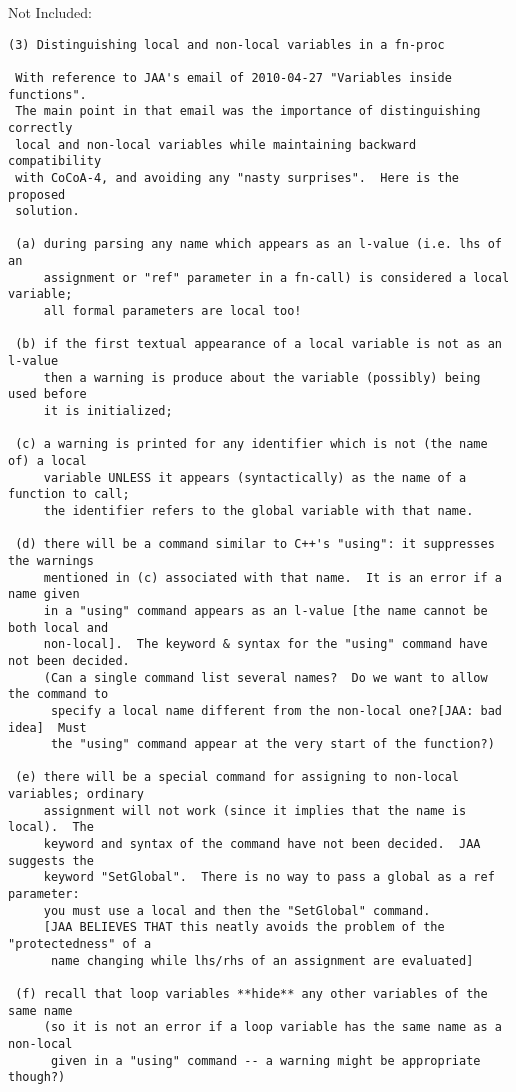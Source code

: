 \documentclass{book}[12,a4paper]
\def\refandpage#1{{\ref{#1}, pg.\pageref{#1}}}
\begin{document}
Not Included: %
\begin{verbatim}
(3) Distinguishing local and non-local variables in a fn-proc

 With reference to JAA's email of 2010-04-27 "Variables inside functions".
 The main point in that email was the importance of distinguishing correctly
 local and non-local variables while maintaining backward compatibility
 with CoCoA-4, and avoiding any "nasty surprises".  Here is the proposed
 solution.

 (a) during parsing any name which appears as an l-value (i.e. lhs of an
     assignment or "ref" parameter in a fn-call) is considered a local variable;
     all formal parameters are local too!

 (b) if the first textual appearance of a local variable is not as an l-value
     then a warning is produce about the variable (possibly) being used before
     it is initialized;

 (c) a warning is printed for any identifier which is not (the name of) a local
     variable UNLESS it appears (syntactically) as the name of a function to call;
     the identifier refers to the global variable with that name.

 (d) there will be a command similar to C++'s "using": it suppresses the warnings
     mentioned in (c) associated with that name.  It is an error if a name given
     in a "using" command appears as an l-value [the name cannot be both local and
     non-local].  The keyword & syntax for the "using" command have not been decided.
     (Can a single command list several names?  Do we want to allow the command to
      specify a local name different from the non-local one?[JAA: bad idea]  Must
      the "using" command appear at the very start of the function?)

 (e) there will be a special command for assigning to non-local variables; ordinary
     assignment will not work (since it implies that the name is local).  The
     keyword and syntax of the command have not been decided.  JAA suggests the
     keyword "SetGlobal".  There is no way to pass a global as a ref parameter:
     you must use a local and then the "SetGlobal" command.
     [JAA BELIEVES THAT this neatly avoids the problem of the "protectedness" of a
      name changing while lhs/rhs of an assignment are evaluated]

 (f) recall that loop variables **hide** any other variables of the same name
     (so it is not an error if a loop variable has the same name as a non-local
      given in a "using" command -- a warning might be appropriate though?)



\end{verbatim}
\end{document}
